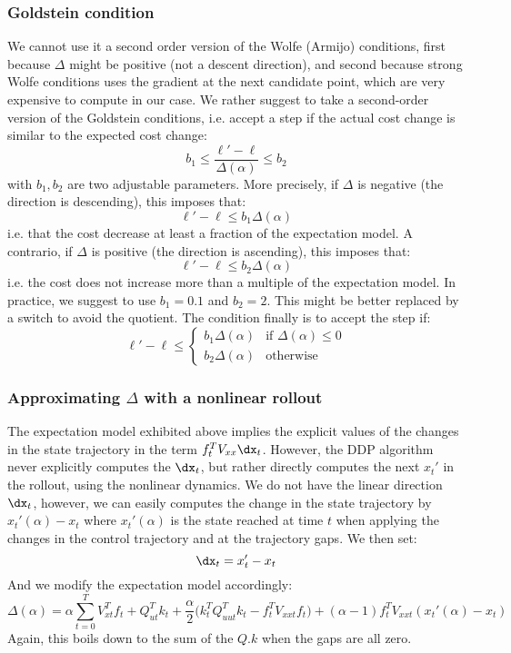 \documentclass[10pt,a4paper]{article}
\begin{document}
\subsubsection{Goldstein condition}
We cannot use it a second order version of the Wolfe (Armijo) conditions, first because $\Delta$ might be positive (not a descent direction), and second because strong Wolfe conditions uses the gradient at the next candidate point, which are very expensive to compute in our case.
We rather suggest to take a second-order version of the Goldstein conditions, i.e. accept a step if the actual cost change is similar to the expected cost change:
$$ b_1 \le \frac{\ell'-\ell}{\Delta(\alpha)} \le b_2$$
with $b_1,b_2$ are two adjustable parameters.
More precisely, if $\Delta$ is negative (the direction is descending), this imposes that:
$$\ell'-\ell \le b_1 \Delta(\alpha)$$
i.e. that the cost decrease at least a fraction of the expectation model.
A contrario, if $\Delta$ is positive (the direction is ascending), this imposes that:
$$\ell'-\ell \le b_2 \Delta(\alpha)$$
i.e. the cost does not increase more than a multiple of the expectation model.
In practice, we suggest to use $b_1=0.1$ and $b_2=2$.
This might be better replaced by a switch to avoid the quotient.
The condition finally is to accept the step if:
$$\ell'-\ell \le
\begin{cases}
  b_1 \Delta(\alpha) & \textrm{if }\Delta(\alpha)\le 0 \\
  b_2 \Delta(\alpha) & \textrm{otherwise}
\end{cases}
$$

\subsubsection{Approximating $\Delta$ with a nonlinear rollout}

The expectation model exhibited above implies the explicit values of the changes in the state trajectory in the term $f_t^T V_{xx} \dx_t$.
However, the DDP algorithm never explicitly computes the $\dx_t$, but rather directly computes the next $x_t'$ in the rollout, using the nonlinear dynamics.
We do not have the linear direction $\dx_t$, however, we can easily computes the change in the state trajectory by $x_t'(\alpha)-x_t$ where $x_t'(\alpha)$ is the state reached at time $t$ when applying the changes in the control trajectory and at the trajectory gaps.
We then set:
$$\dx_t = x_t'-x_t$$
And we modify the expectation model accordingly:
$$\Delta(\alpha) = \alpha \sum_{t=0}^T V_{xt}^T f_t + Q_{ut}^T k_t 
+ \frac{\alpha}{2} \Big( k_t^T Q_{uut}^T k_t-f_t^T V_{xxt} f_t \Big)
+ (\alpha-1) f_t^T V_{xxt} (x_t'(\alpha) - x_t)$$
Again, this boils down to the sum of the $Q.k$ when the gaps are all zero.




{
\small

}
\end{document}
